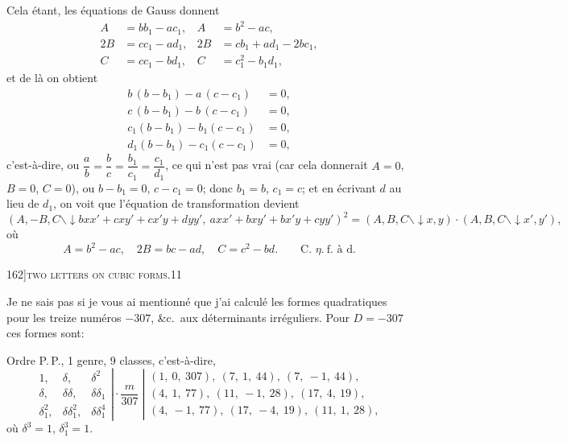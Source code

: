 \documentclass[11pt]{article}
\begin{document}
Cela \'etant, les \'equations de Gauss donnent
\begin{align*}
A &= bb_{1} - ac_{1}, & A &= b^{2} - ac,\\
2B &= cc_{1} - ad_{1}, & 2B &= cb_{1} + ad_{1} - 2bc_{1},\\
C &= cc_{1} - bd_{1}, & C &= c_{1}^{2} - b_{1}d_{1},
\end{align*}
et de l\`a on obtient
\begin{align*}
b\,(b - b_{1}) - a\,(c - c_{1}) &= 0,\\
c\,(b - b_{1}) - b\,(c - c_{1}) &= 0,\\
c_{1}(b - b_{1}) - b_{1}(c - c_{1}) &= 0,\\
d_{1}(b - b_{1}) - c_{1}(c - c_{1}) &= 0,
\end{align*}
c'est-\`a-dire, ou $\dfrac{a}{b} = \dfrac{b}{c} = \dfrac{b_{1}}{c_{1}} = \dfrac{c_{1}}{d_{1}}$, ce qui n'est pas vrai (car cela donnerait $A = 0$, $B = 0$, $C = 0$),
ou $b - b_{1} = 0$, $c - c_{1} = 0$; donc $b_{1} = b$, $c_{1} = c$; et en \'ecrivant $d$ au lieu de $d_{1}$, on voit que
l'\'equation de transformation devient
\[
(A, -B, C \mathbin{\backslash\!\!\!\downarrow} bxx' + cxy' + cx'y + dyy',\ axx' + bxy' + bx'y + cyy')^{2}
= (A, B, C \mathbin{\backslash\!\!\!\downarrow} x, y) \cdot (A, B, C \mathbin{\backslash\!\!\!\downarrow} x', y'),
\]
o\`u
\[
A = b^{2} - ac,\quad 2B = bc - ad,\quad C = c^{2} - bd.\qquad \text{C.\ }\eta.\ \text{f.\ \`a\ d.}
\]

\newpage

\begin{center}
\small 162]\hfill\textsc{two letters on cubic forms.}\hfill\textsc{11}
\end{center}

\medskip

Je ne sais pas si je vous ai mentionn\'e que j'ai calcul\'e les formes quadratiques
pour les treize num\'eros $-307$, \&c.\ aux d\'eterminants irr\'eguliers. Pour $D = -307$ ces
formes sont:
\medskip

\noindent Ordre P.\,P., 1 genre, 9 classes, c'est-\`a-dire,
\[
\left.
\begin{array}{ccc}
1, & \delta, & \delta^{2}\\
\delta, & \delta\delta, & \delta\delta_{1}\\
\delta_{1}^{2}, & \delta\delta_{1}^{2}, & \delta\delta_{1}^{4}
\end{array}
\right| \cdot \frac{m}{307}\ \left| \begin{array}{l}
(1,\ 0,\ 307),\ (7,\ 1,\ 44),\ (7,\ -1,\ 44),\\
(4,\ 1,\ 77),\ (11,\ -1,\ 28),\ (17,\ 4,\ 19),\\
(4,\ -1,\ 77),\ (17,\ -4,\ 19),\ (11,\ 1,\ 28),
\end{array} \right.
\]
o\`u $\delta^{3} = 1$, $\delta_{1}^{3} = 1$.
\end{document}
